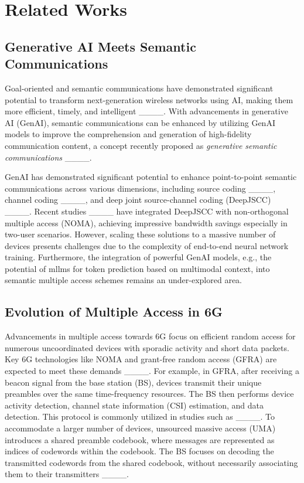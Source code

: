 \section{Related Works}
\subsection{Generative AI Meets Semantic Communications}
Goal-oriented and semantic communications have demonstrated significant potential to transform next-generation wireless networks using AI, making them more efficient, timely, and intelligent ____. 
With advancements in generative AI (GenAI), semantic communications can be enhanced by utilizing GenAI models to improve the comprehension and generation of high-fidelity communication content, a concept recently proposed as {\it generative semantic communications} ____.

GenAI has demonstrated significant potential to enhance point-to-point semantic communications across various dimensions, including source coding ____, channel coding ____, and deep joint source-channel coding (DeepJSCC) ____. Recent studies ____ have integrated DeepJSCC with non-orthogonal multiple access (NOMA), achieving impressive bandwidth savings especially in two-user scenarios. However, scaling these solutions to a massive number of devices presents challenges due to the complexity of end-to-end neural network training. Furthermore, the integration of powerful GenAI models, e.g., the potential of \gls*{mllm}s for token prediction based on multimodal context, into semantic multiple access schemes remains an under-explored area.

\subsection{Evolution of Multiple Access in 6G}

Advancements in multiple access towards 6G focus on efficient random access for numerous uncoordinated devices with sporadic activity and short data packets. Key 6G technologies like NOMA and grant-free random access (GFRA) are expected to meet these demands ____. For example, in GFRA, after receiving a beacon signal from the base station (BS), devices transmit their unique preambles over the same time-frequency resources. The BS then performs device activity detection, channel state information (CSI) estimation, and data detection. This protocol is commonly utilized in studies such as ____.
To accommodate a larger number of devices, unsourced massive access (UMA) introduces a shared preamble codebook, where messages are represented as indices of codewords within the codebook. The BS focuses on decoding the transmitted codewords from the shared codebook, without necessarily associating them to their transmitters ____. 

